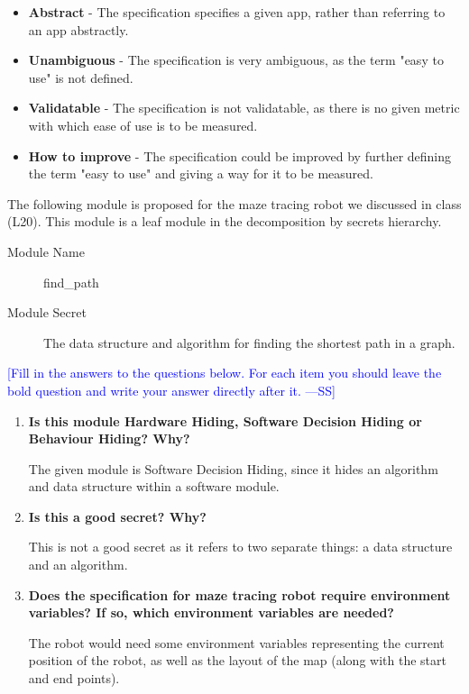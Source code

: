 \documentclass[12pt,fleqn]{examtst}
\newcommand{\authornote}[3]{\textcolor{#1}{[#3 ---#2]}}
\newcommand{\authornote}[3]{}
\newcommand{\wss}[1]{\authornote{blue}{SS}{#1}}
\begin{document}
\begin{itemize}
\item \textbf{Abstract} - The specification specifies a given app, rather than referring to an app abstractly.
\item \textbf{Unambiguous} - The specification is very ambiguous, as the term "easy to use" is not defined.
\item \textbf{Validatable} - The specification is not validatable, as there is no given metric with which ease of use is to be measured.
\item \textbf{How to improve} - The specification could be improved by further defining the term "easy to use" and giving a way for it to be measured.
\end{itemize}


\newpage

 The following module is proposed for the maze tracing robot
we discussed in class (L20).  This module is a leaf module in the decomposition
by secrets hierarchy.

\begin{description}
\item [Module Name] find\_path
\item [Module Secret] The data structure and algorithm for finding the shortest
  path in a graph.
\end{description}

\noindent \wss{Fill in the answers to the questions below.  For each item you
  should leave the bold question and write your answer directly after it.}

\begin{enumerate}
\item \textbf{Is this module Hardware Hiding, Software Decision Hiding or
    Behaviour Hiding?  Why?}

 The given module is Software Decision Hiding, since it hides an algorithm and data structure within a software module.

\item \textbf{Is this a good secret?  Why?}

This is not a good secret as it refers to two separate things: a data structure and an algorithm.

\item \textbf{Does the specification for maze tracing robot require environment
    variables?  If so, which environment variables are needed?}

The robot would need some environment variables representing the current position of the robot, as well as the layout of the map (along with the start and end points).

\end{enumerate}
\end{document}
